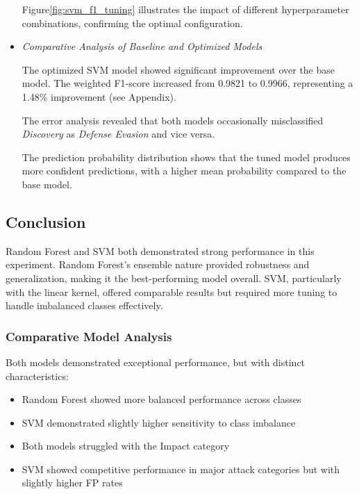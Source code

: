 \begin{itemize}
                    Figure\ref{fig:svm_f1_tuning} illustrates the impact of different hyperparameter combinations, confirming the optimal configuration.

                \vspace{0.5em}

                \item \textit{Comparative Analysis of Baseline and Optimized Models}
                
                    \vspace{0.3em}
                    
                    The optimized SVM model showed significant improvement over the base model. The weighted F1-score increased from 0.9821 to 0.9966, representing a 1.48\% improvement (see Appendix). 

                    The error analysis revealed that both models occasionally misclassified \textit{Discovery} as \textit{Defense Evasion} and vice versa.

                    The prediction probability distribution shows that the tuned model produces more confident predictions, with a higher mean probability compared to the base model.
                    
            \end{itemize}

    \subsection{Conclusion} %
    
        Random Forest and SVM both demonstrated strong performance in this experiment. Random Forest's ensemble nature provided robustness and generalization, making it the best-performing model overall. SVM, particularly with the linear kernel, offered comparable results but required more tuning to handle imbalanced classes effectively.
        
    \subsubsection{Comparative Model Analysis\\}
    
        Both models demonstrated exceptional performance, but with distinct characteristics:
        
        \begin{itemize}
            \item Random Forest showed more balanced performance across classes
            \item SVM demonstrated slightly higher sensitivity to class imbalance
            \item Both models struggled with the Impact category
            \item SVM showed competitive performance in major attack categories but with slightly higher FP rates
        \end{itemize}

